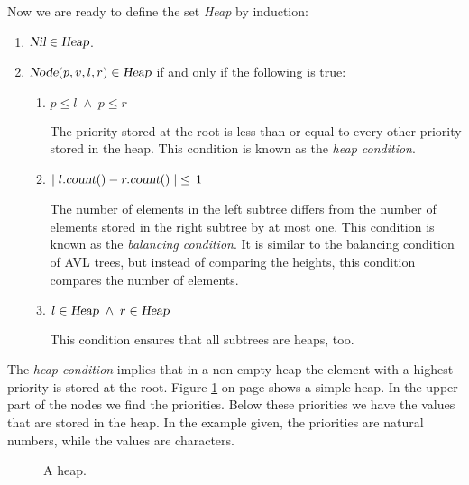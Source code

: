 Now we are ready to define the set \textsl{Heap} by induction:
\begin{enumerate}
\item $\textsl{Nil} \in \textsl{Heap}$.
\item $\textsl{Node}(p,v,l,r) \in \textsl{Heap}$ if and only if the following is true:
      \begin{enumerate}
      \item $p \leq l \;\wedge\; p \leq r$

            The priority stored at the root is less than or equal to every other priority stored in
            the heap. This condition is known as the \emph{heap condition}.
      \item $\mid l.\textsl{count}() - r.\textsl{count}() \mid \;\leq\, 1$

            The number of elements in the left subtree differs from the number of elements stored in
            the right subtree by at most one.
            This condition is known as the  \emph{balancing condition}.  It is similar to the
            balancing condition of AVL trees, but instead of comparing the heights, this condition
            compares the number of elements.
      \item $l \in \textsl{Heap} \;\wedge\; r \in \textsl{Heap}$

            This condition ensures that all subtrees are heaps, too.
      \end{enumerate}
\end{enumerate}
The  \emph{heap condition} implies that in a non-empty heap the element with a highest priority is
stored at the root.  Figure \ref{fig:heap-list} on page \pageref{fig:heap-list} shows a simple heap.
In the upper part of the nodes we find the priorities.  Below these priorities we have the values
that are stored in the heap.  In the example given, the priorities are natural numbers, while the
values are characters.


\begin{figure}[!t]
  \centering
  \caption{A heap.}
  \label{fig:heap-list}
\end{figure}

